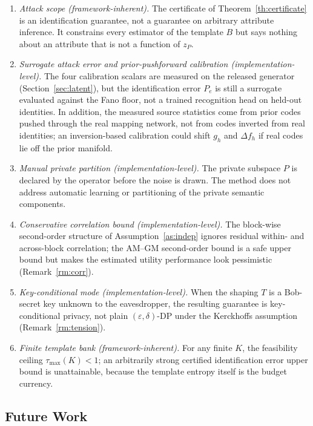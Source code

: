 \documentclass{ieeetj}
\theoremstyle{plain}
\theoremstyle{definition}
\begin{document}
\begin{enumerate}
\item[(L1)] \emph{Attack scope (framework-inherent).} The certificate of
Theorem~\ref{th:certificate} is an identification guarantee, not a guarantee on
arbitrary attribute inference. It constrains every estimator of the template
$B$ but says nothing about an attribute that is not a function of $z_P$.
\item[(L2)] \emph{Surrogate attack error and prior-pushforward calibration
(implementation-level).}
The four calibration scalars are measured on the released generator
(Section~\ref{sec:latent}), but the identification error $P_e$ is still a
surrogate evaluated against the Fano floor, not a trained recognition head on
held-out identities. In addition, the measured source statistics come from
prior codes pushed through the real mapping network, not from codes inverted
from real identities; an inversion-based calibration could shift $g_h$ and
$\Delta f_h$ if real codes lie off the prior manifold.
\item[(L3)] \emph{Manual private partition (implementation-level).} The private subspace $P$ is
declared by the operator before the noise is drawn. The method does not address
automatic learning or partitioning of the private semantic components.
\item[(L4)] \emph{Conservative correlation bound (implementation-level).} The block-wise second-order
structure of Assumption~\ref{as:indep} ignores residual within- and
across-block correlation; the AM--GM second-order bound is a safe upper bound but makes the
estimated utility performance look pessimistic (Remark~\ref{rm:corr}).
\item[(L5)] \emph{Key-conditional mode (implementation-level).} When the shaping $T$ is a Bob-secret
key unknown to the eavesdropper, the resulting guarantee is key-conditional
privacy, not plain $(\varepsilon,\delta)$-DP under the Kerckhoffs assumption
(Remark~\ref{rm:tension}).
\item[(L6)] \emph{Finite template bank (framework-inherent).} For any finite $K$, the feasibility
ceiling $\tau_{\max}(K)<1$; an arbitrarily strong certified identification
error upper bound is unattainable, because the template entropy itself is the
budget currency.
\end{enumerate}

\subsection{Future Work}
\end{document}
